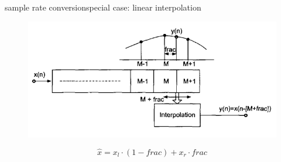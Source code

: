 	\begin{frame}{sample rate conversion}{special case: linear interpolation}
        \begin{figure}
            \begin{center}
                \includegraphics[scale=0.4]{Graph/src_lininterpol}
            \end{center}
        \end{figure}
        
        \begin{equation*}
            \hat{x} = x_l\cdot (1-frac) + x_r\cdot frac
        \end{equation*}
    \end{frame}
